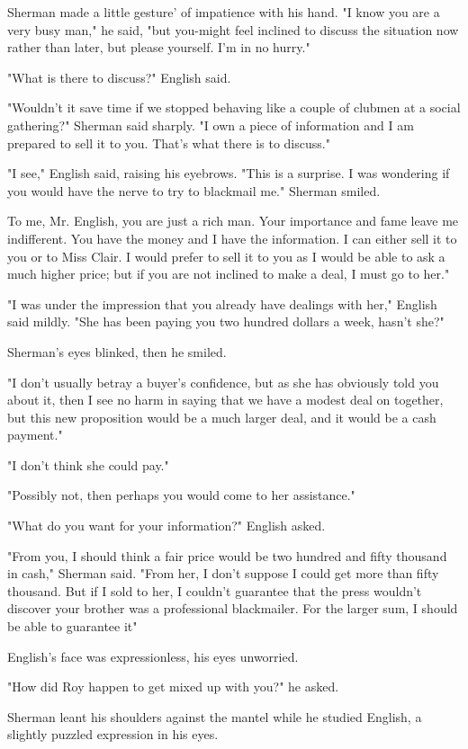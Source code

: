 \documentclass{novel}
\begin{document}
Sherman made a little gesture' of impatience with his hand. "I know you are a very busy man," he said, "but you-might feel inclined to discuss the situation now rather than later, but please yourself. I'm in no hurry."

"What is there to discuss?" English said.

"Wouldn't it save time if we stopped behaving like a couple of clubmen at a social gathering?" Sherman said sharply. "I own a piece of information and I am prepared to sell it to you. That's what there is to discuss."

"I see," English said, raising his eyebrows. "This is a surprise. I was wondering if you would have the nerve to try to blackmail me." Sherman smiled.

\*To me, Mr. English, you are just a rich man. Your importance and fame leave me indifferent. You have the money and I have the information. I can either sell it to you or to Miss Clair. I would prefer to sell it to you as I would be able to ask a much higher price; but if you are not inclined to make a deal, I must go to her."

"I was under the impression that you already have dealings with her," English said mildly. "She has been paying you two hundred dollars a week, hasn't she?"

Sherman's eyes blinked, then he smiled.

"I don't usually betray a buyer's confidence, but as she has obviously told you about it, then I see no harm in saying that we have a modest deal on together, but this new proposition would be a much larger deal, and it would be a cash payment."

"I don't think she could pay."

"Possibly not, then perhaps you would come to her assistance."

"What do you want for your information?" English asked.

"From you, I should think a fair price would be two hundred and fifty thousand in cash," Sherman said. "From her, I don't suppose I could get more than fifty thousand. But if I sold to her, I couldn't guarantee that the press wouldn't discover your brother was a professional blackmailer. For the larger sum, I should be able to guarantee it"

English's face was expressionless, his eyes unworried.

"How did Roy happen to get mixed up with you?" he asked.

Sherman leant his shoulders against the mantel while he studied English, a slightly puzzled expression in his eyes.
\end{document}
